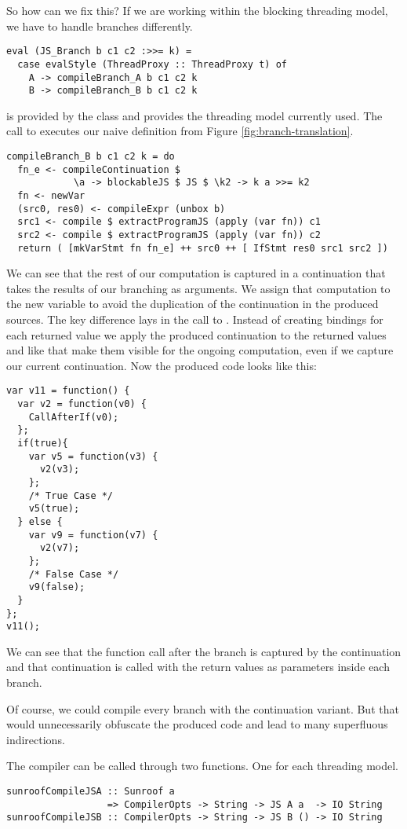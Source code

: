 So how can we fix this? If we are working within the blocking 
threading model, we have to handle branches differently.
\begin{verbatim}
eval (JS_Branch b c1 c2 :>>= k) = 
  case evalStyle (ThreadProxy :: ThreadProxy t) of
    A -> compileBranch_A b c1 c2 k
    B -> compileBranch_B b c1 c2 k
\end{verbatim}
 is provided by the class  and
provides the threading model currently used. The call to 
executes our naive definition from Figure \ref{fig:branch-translation}.
\begin{verbatim}
compileBranch_B b c1 c2 k = do
  fn_e <- compileContinuation $
            \a -> blockableJS $ JS $ \k2 -> k a >>= k2
  fn <- newVar
  (src0, res0) <- compileExpr (unbox b)
  src1 <- compile $ extractProgramJS (apply (var fn)) c1
  src2 <- compile $ extractProgramJS (apply (var fn)) c2
  return ( [mkVarStmt fn fn_e] ++ src0 ++ [ IfStmt res0 src1 src2 ])
\end{verbatim}
We can see that the rest of our computation is captured in a
continuation  that takes the results of our branching
as arguments. We assign that computation to the new variable 
to avoid the duplication of the continuation in the produced sources.
The key difference lays in the call to . Instead
of creating bindings for each returned value we apply the produced
continuation to the returned values and like that make them visible for
the ongoing computation, even if we capture our current continuation. 
Now the produced code looks like this:
\begin{verbatim}
var v11 = function() {
  var v2 = function(v0) {
    CallAfterIf(v0);
  };
  if(true){
    var v5 = function(v3) {
      v2(v3);
    };
    /* True Case */
    v5(true);
  } else {
    var v9 = function(v7) {
      v2(v7);
    };
    /* False Case */
    v9(false);
  }
};
v11();
\end{verbatim}
We can see that the function call after the branch is captured by the 
continuation  and that continuation is called with the 
return values as parameters inside each branch.

Of course, we could compile every branch with the 
continuation variant. But that would unnecessarily 
obfuscate the produced code and lead to many superfluous 
indirections.

The compiler can be called through two functions. 
One for each threading model. 
\begin{verbatim}
sunroofCompileJSA :: Sunroof a 
                  => CompilerOpts -> String -> JS A a  -> IO String
sunroofCompileJSB :: CompilerOpts -> String -> JS B () -> IO String
\end{verbatim}

